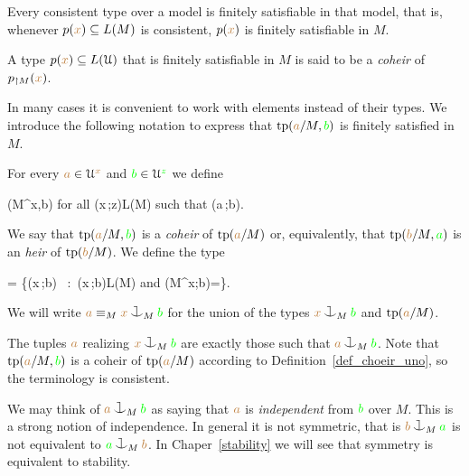 \begin{proposition}\label{prop_coher_over_model}
  Every consistent type over a model is finitely satisfiable in that model, that is, whenever $p({\color{brown} x})\subseteq L(M)$ is consistent, $p({\color{brown} x})$ is finitely satisfiable in $M$.
\end{proposition}

\begin{definition}\label{def_choeir_uno}
  A type $p({\color{brown} x}) \subseteq L(\EuScript U)$ that is finitely satisfiable in $M$ is said to be a \emph{coheir\/} of $p_{\restriction M}({\color{brown} x})$.
\end{definition}

In many cases it is convenient to work with elements instead of their types.
We introduce the following notation to express that ${\rm tp}({\color{brown} a}/M,{\color{green} b})$ is finitely satisfied in $M$.

\begin{definition}\label{def_coheir_idepencence}
  For every ${\color{brown} a}\in\EuScript U^{\color{brown} x}$ and ${\color{green} b}\in\EuScript U^{\color{green} z}$ we define

  \noindent\llap{\textcolor{red}{\Large\warning}\kern1.5ex}
  {\IFF}
  {\phi(M^{\mr x},{\gr b})\neq\0
  \textrm{ for all }\phi({\mr x}\,;{\gr z})\in L(M) 
  \textrm{ such that }\phi({\mr a}\,;{\gr b})}.

  We say that ${\rm tp}({\color{brown} a}/M,{\color{green} b})$ is a \emph{coheir} of ${\rm tp}({\color{brown} a}/M)$ or, equivalently, that ${\rm tp}({\color{brown} b}/M,{\color{green} a})$ is an \emph{heir} of ${\rm tp}({\color{brown} b}/M)$.
  We define the type

  {=}
  {\Big\{\neg\phi({\mr x}\,;{\gr b})
  \ :\ 
  \phi({\mr x}\,;{\gr b})\in L(M)
  \textrm{ and } \phi(M^{\mr x};{\gr b})=\0\Big\}.}

  We will write \emph{${\mr a}\equiv_M{\mr x}\cnonfork_M{\gr b}$} for the union of the types ${\mr x}\cnonfork_M{\gr b}$ and ${\rm tp}({\color{brown} a}/M)$.
\end{definition}

The tuples ${\color{brown} a}$ realizing ${\mr x}\cnonfork_M{\gr b}$ are exactly those such that ${\mr a}\cnonfork_M{\gr b}$.
Note that ${\rm tp}({\color{brown} a}/M,{\color{green} b})$ is a coheir of ${\rm tp}({\color{brown} a}/M)$ according to Definition~\ref{def_choeir_uno}, so the terminology is consistent.

We may think of ${\mr a}\cnonfork_M{\gr b}$ as saying that 
${\color{brown} a}$ is \emph{independent\/} from ${\color{green} b}$ over $M$.
This is a strong notion of independence.
In general it is not symmetric, that is ${\mr b}\cnonfork_M{\gr a}$ is not equivalent to ${\gr a}\cnonfork_M{\mr b}$. In Chaper~\ref{stability} we will see that symmetry is equivalent to stability.

